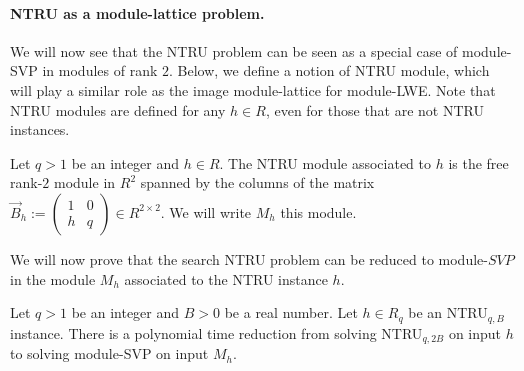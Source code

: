 
\paragraph{NTRU as a module-lattice problem.} We will now see that the NTRU problem can be seen as a special case of module-SVP in modules of rank $2$. Below, we define a notion of NTRU module, which will play a similar role as the image module-lattice for module-LWE. Note that NTRU modules are defined for any $h \in R$, even for those that are not NTRU instances.

\begin{definition}
\label{def:NTRU-module}
Let $q > 1$ be an integer and $h \in R$. The NTRU module associated to $h$ is the free rank-$2$ module in $R^2$ spanned by the columns of the matrix
$\vec B_h := \begin{pmatrix}
1 & 0 \\
h & q
\end{pmatrix} \in R^{2 \times 2}$.
We will write $M_h$ this module.
\end{definition}

We will now prove that the search NTRU problem can be reduced to module-$SVP$ in the module $M_h$ associated to the NTRU instance $h$.

\begin{lemma}
Let $q >1$ be an integer and $B >0$ be a real number. Let $h \in R_q$ be an NTRU$_{q,B}$ instance. There is a polynomial time reduction from solving NTRU$_{q,2B}$ on input $h$ to solving module-SVP on input $M_h$.
\end{lemma}


